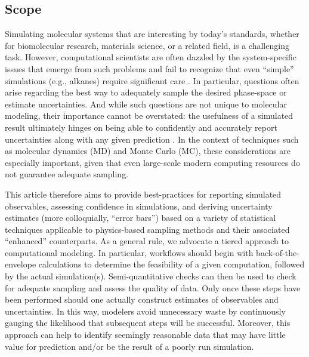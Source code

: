 %
%
%

\subsection{Scope}

Simulating molecular systems that are interesting by today's standards, whether for biomolecular research, materials science, or a related field, is a challenging task.
However, computational scientists are often dazzled by the system-specific issues that emerge from such problems and fail to recognize that even ``simple'' simulations (e.g., alkanes) require significant care \cite{Schappals2017}.  In particular, questions often arise regarding the best way to adequately sample the desired phase-space or estimate uncertainties.  And while such questions are not unique to molecular modeling, their importance cannot be overstated: the usefulness of a simulated result ultimately hinges on being able to confidently and accurately report uncertainties along with any given prediction \cite{Nicholls2014}.  In the context of techniques such as molecular dynamics (MD) and Monte Carlo (MC), these considerations are especially important, given that even large-scale modern computing resources do not guarantee adequate sampling.

This article therefore aims to provide best-practices for reporting simulated observables, assessing confidence in simulations, and deriving uncertainty estimates (more colloquially, ``error bars'') based on a variety of statistical techniques applicable to physics-based sampling methods and their associated ``enhanced'' counterparts.  As a general rule, we advocate a tiered approach to computational modeling.  In particular, workflows should begin with back-of-the-envelope calculations to determine the feasibility of a given computation, followed by the actual simulation(s).  Semi-quantitative checks can then be used to check for adequate sampling and assess the quality of data.  Only once these steps have been performed should one actually construct estimates of observables and uncertainties.  In this way, modelers avoid unnecessary waste by continuously gauging the likelihood that subsequent steps will be successful.  Moreover, this approach can help to identify seemingly reasonable data that may have little value for prediction and/or be the result of a poorly run simulation.


